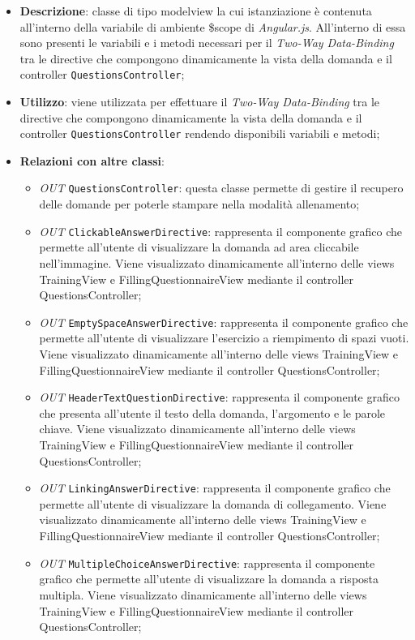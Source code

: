 \begin{itemize}
	\item \textbf{Descrizione}: classe di tipo modelview la cui istanziazione è contenuta all'interno della variabile di ambiente \$scope di \textit{Angular.js}. All'interno di essa sono presenti le variabili e i metodi necessari per il \textit{Two-Way Data-Binding} tra le directive che compongono dinamicamente la vista della domanda e il controller \texttt{QuestionsController};
	\item \textbf{Utilizzo}: viene utilizzata per effettuare il \textit{Two-Way Data-Binding} tra le directive che compongono dinamicamente la vista della domanda e il controller \texttt{QuestionsController} rendendo disponibili variabili e metodi;
	\item \textbf{Relazioni con altre classi}: 
	\begin{itemize} 
		\item \textit{OUT} \texttt{QuestionsController}: questa classe permette di gestire il recupero delle domande per poterle stampare nella modalità allenamento;
		\item \textit{OUT} \texttt{ClickableAnswerDirective}: rappresenta il componente grafico che permette all'utente di visualizzare la domanda ad area cliccabile nell'immagine. Viene visualizzato dinamicamente all'interno delle views TrainingView e FillingQuestionnaireView mediante il controller QuestionsController;
		\item \textit{OUT} \texttt{EmptySpaceAnswerDirective}: rappresenta il componente grafico che permette all'utente di visualizzare l'esercizio a riempimento di spazi vuoti. Viene visualizzato dinamicamente all'interno delle views TrainingView e FillingQuestionnaireView mediante il controller QuestionsController;
		\item \textit{OUT} \texttt{HeaderTextQuestionDirective}: rappresenta il componente grafico che presenta all'utente il testo della domanda, l'argomento e le parole chiave. Viene visualizzato dinamicamente all'interno delle views TrainingView e FillingQuestionnaireView mediante il controller QuestionsController;
		\item \textit{OUT} \texttt{LinkingAnswerDirective}: rappresenta il componente grafico che permette all'utente di visualizzare la domanda di collegamento. Viene visualizzato dinamicamente all'interno delle views TrainingView e FillingQuestionnaireView mediante il controller QuestionsController;
		\item \textit{OUT} \texttt{MultipleChoiceAnswerDirective}: rappresenta il componente grafico che permette all'utente di visualizzare la domanda a risposta multipla. Viene visualizzato dinamicamente all'interno delle views TrainingView e FillingQuestionnaireView mediante il controller QuestionsController;

\end{itemize}
\end{itemize}
